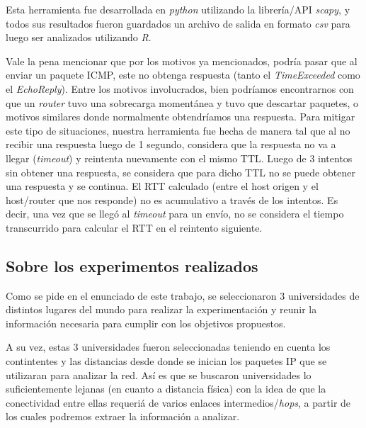 \par Esta herramienta fue desarrollada en \textit{python}\cite{python}
utilizando la librer\'ia/API \textit{scapy}\cite{scapy}, y todos sus resultados
fueron guardados un archivo de salida en formato \textit{csv}\cite{csv} para
luego ser analizados utilizando \textit{R}\cite{R}.

\par Vale la pena mencionar que por los motivos ya mencionados, podr\'ia pasar
que al enviar un paquete ICMP, este no obtenga respuesta (tanto el \textit{%
TimeExceeded} como el \textit{EchoReply}). Entre los motivos involucrados, bien
podr\'iamos encontrarnos con que un \textit{router} tuvo una sobrecarga
moment\'anea y tuvo que descartar paquetes, o motivos similares donde
normalmente obtendr\'iamos una respuesta. Para mitigar este tipo de situaciones,
nuestra herramienta fue hecha de manera tal que al no recibir una respuesta
luego de 1 segundo, considera que la respuesta no va a llegar (\textit{timeout})
y reintenta nuevamente con el mismo TTL. Luego de 3 intentos sin obtener una
respuesta, se considera que para dicho TTL no se puede obtener una respuesta
y se continua. El RTT calculado (entre el host origen y el host/router que nos
responde) no es acumulativo a trav\'es de los intentos. Es decir, una vez que
se lleg\'o al \textit{timeout} para un env\'io, no se considera el tiempo
transcurrido para calcular el RTT en el reintento siguiente.


\subsection*{Sobre los experimentos realizados}\label{sec:experimentacion}
\par Como se pide en el enunciado de este trabajo, se seleccionaron 3
universidades de distintos lugares del mundo para realizar la experimentaci\'on
y reunir la informaci\'on necesaria para cumplir con los objetivos propuestos.

\par A su vez, estas 3 universidades fueron seleccionadas teniendo en cuenta
los contintentes y las distancias desde donde se inician los paquetes IP que
se utilizaran para analizar la red. As\'i es que se buscaron universidades
lo suficientemente lejanas (en cuanto a distancia f\'isica) con la idea de que
la conectividad entre ellas
requeri\'a de varios enlaces intermedios/\textit{hops}, a partir de los cuales
podremos extraer la informaci\'on a analizar.

